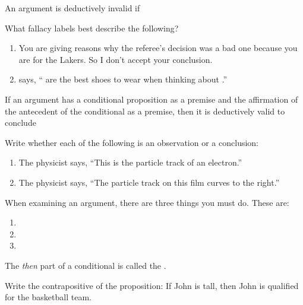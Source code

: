 \documentclass{examdesign}
\begin{document}
\begin{fillin}[title={Fill in the blanks (3 pts. each)}]
\begin{question}
  An argument is deductively invalid if \hrulefill
\end{question}

\begin{question}
  What fallacy labels best describe the following?
    \begin{enumerate}
      \item You are giving reasons why the referee's decision was a bad one
      because you are for the Lakers. So I don't accept your conclusion. \hrulefill
      \item {} says, ``
      are the best shoes to wear when thinking about .'' \hrulefill
    \end{enumerate}
\end{question}

\begin{question}
  If an argument has a conditional proposition as a premise and the affirmation
  of the antecedent of the conditional as a premise, then it is deductively
  valid to conclude \hrulefill
\end{question}

\begin{question}
  Write whether each of the following is an observation or a conclusion:
    \begin{enumerate}
      \item The physicist says, ``This is the particle track of an electron.''
      \hrulefill
      \item The physicist says, ``The particle track on this film curves to the
      right.'' \hrulefill
    \end{enumerate}
\end{question}

\begin{question}
  When examining an argument, there are three things you must do. These are:
    \begin{enumerate}
      \item \hrulefill
      \item \hrulefill
      \item \hrulefill
    \end{enumerate}
\end{question}

\begin{question}
  The \emph{then} part of a conditional is called the \hrulefill.
\end{question}

\begin{question}
  Write the contrapositive of the proposition: If John is tall, then John is
  qualified for the basketball team. \hrulefill
\end{question}
\end{fillin}
\end{document}

